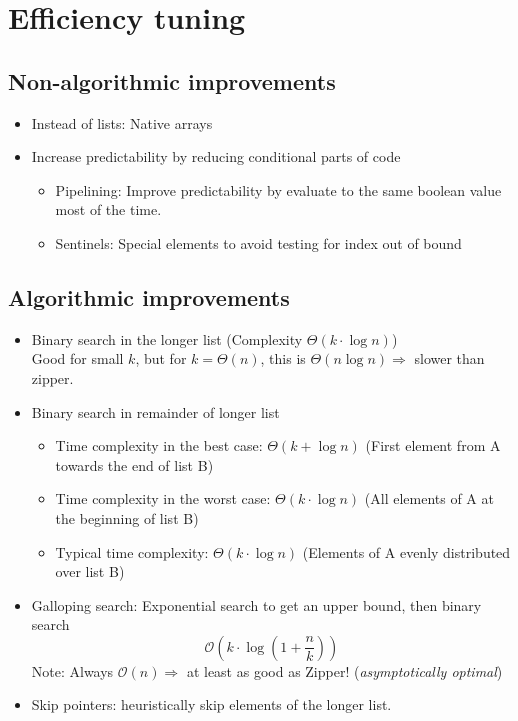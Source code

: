 \documentclass[a4paper]{scrartcl}
\begin{document}
\section{Efficiency tuning}

\subsection{Non-algorithmic improvements}
\begin{itemize}
\item Instead of lists: Native arrays
\item Increase predictability by reducing conditional parts of code
  \begin{itemize}
  \item Pipelining: Improve predictability by evaluate to the same boolean value
    most of the time.
  \item Sentinels: Special elements to avoid testing for index out of bound
  \end{itemize}
\end{itemize}

\subsection{Algorithmic improvements}
\begin{itemize}
\item Binary search in the longer list (Complexity $\Theta(k\cdot \log n)$)\\
  Good for small $k$, but for $k=\Theta(n)$, this is $\Theta(n\log
  n)\Rightarrow$ slower than zipper.
\item Binary search in remainder of longer list
  \begin{itemize}
  \item Time complexity in the best case: $\Theta(k+\log n)$ (First element from
    A towards the end of list B)
  \item Time complexity in the worst case: $\Theta(k\cdot \log n)$ (All elements
    of A at the beginning of list B)
  \item Typical time complexity: $\Theta(k\cdot \log n)$ (Elements of A evenly
    distributed over list B)
  \end{itemize}
\item Galloping search: Exponential search to get an upper bound, then binary
  search
  \[\mathcal{O}\left(k\cdot \log\left(1+\frac{n}{k}\right)\right)\]
  Note: Always $\mathcal{O}(n)\Rightarrow$ at least as good as Zipper!
  (\emph{asymptotically optimal})
\item Skip pointers: heuristically skip elements of the longer list.
\end{itemize}
\end{document}
